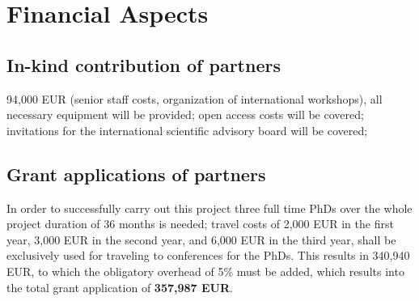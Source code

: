 \documentclass[a4paper,11pt]{article}
\begin{document}


\section{Financial Aspects}
%

\subsection{In-kind contribution of partners}

94,000 EUR (senior staff costs, organization of international workshops), all necessary equipment will be provided; open access costs will be covered; invitations for the international scientific advisory board will be covered;
\\[0,2cm]

\subsection{Grant applications of partners}
In order to successfully carry out this project three full time PhDs over the whole project duration of 36 months is needed; travel costs of 2,000 EUR in the first year, 3,000 EUR in the second year, and 6,000 EUR in the third year, shall be exclusively used for traveling to conferences for the PhDs. This results in 340,940 EUR, to which the obligatory overhead of 5\% must be added, which results into the total grant application of \textbf{357,987 EUR}.
\\[0,2cm]
\end{document}

